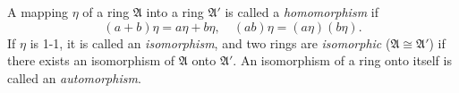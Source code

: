 A mapping $\eta$ of a ring $\mathfrak{A}$ into a ring $\mathfrak{A}'$ is called a \emph{homomorphism} if
$$(a + b)\eta = a\eta + b\eta, \quad (ab)\eta = (a\eta)(b\eta).$$
If $\eta$ is 1-1, it is called an \emph{isomorphism}, and two rings are \emph{isomorphic} ($\mathfrak{A} \cong \mathfrak{A}'$) if there exists an isomorphism of $\mathfrak{A}$ onto $\mathfrak{A}'$. An isomorphism of a ring onto itself is called an \emph{automorphism}.
